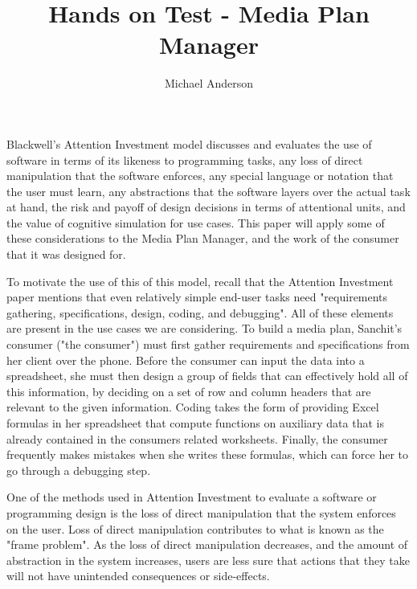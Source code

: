\documentclass{article}
\author{Michael Anderson}
\title{Hands on Test - Media Plan Manager}
\begin{document}
\setlength{\parskip}{1em}
\maketitle
{}
\flushleft
\newpage

	Blackwell's Attention Investment model discusses and evaluates the use of software in terms of its likeness to programming tasks, any loss of direct manipulation that the software enforces, any special language or notation that the user must learn, any abstractions that the software layers over the actual task at hand, the risk and payoff of design decisions in terms of attentional units, and the value of cognitive simulation for use cases. This paper will apply some of these considerations to the Media Plan Manager, and the work of the consumer that it was designed for.
	
	To motivate the use of this of this model, recall that the Attention Investment paper mentions that even relatively simple end-user tasks need "requirements gathering, specifications, design, coding, and debugging". All of these elements are present in the use cases we are considering. To build a media plan, Sanchit's consumer ("the consumer") must first gather requirements and specifications from her client over the phone. Before the consumer can input the data into a spreadsheet, she must then design a group of fields that can effectively hold all of this information, by deciding on a set of row and column headers that are relevant to the given information. Coding takes the form of providing Excel formulas in her spreadsheet that compute functions on auxiliary data that is already contained in the consumers related worksheets. Finally, the consumer frequently makes mistakes when she writes these formulas, which can force her to go through a debugging step.
	
	One of the methods used in Attention Investment to evaluate a software or programming design is the loss of direct manipulation that the system enforces on the user. Loss of direct manipulation contributes to what is known as the "frame problem". As the loss of direct manipulation decreases, and the amount of abstraction in the system increases, users are less sure that actions that they take will not have unintended consequences or side-effects.
	
\end{document}
